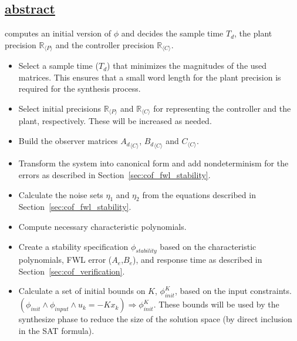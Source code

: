 \documentclass[a4paper,UKenglish]{lipics-v2018}
\newcommand{\mat}[1]{{#1}}
\renewcommand{\vec}[1]{{#1}}
\newcommand{\note}[1]{\textcolor{red}{[#1]}}
\begin{document}
\subsection*{\underline{{\sc abstract}}} computes an initial version of $\phi$
and decides the sample time $T_d$,
the plant precision $\mathbb{R}_{\langle P \rangle}$ and the controller precision
$\mathbb{R}_{\langle C \rangle}$.
%
\begin{itemize}
\item Select a sample time ($T_d$) that minimizes the magnitudes of the used matrices.
This ensures that a small word length for the plant precision is required for
the synthesis process.
\item Select initial precisions $\mathbb{R}_{\langle P \rangle}$ and $\mathbb{R}_{\langle C \rangle}$
  for representing the controller and the plant, respectively. These will be increased as needed.
\item Build the observer matrices ${\mat{A}_d}_{\langle C \rangle}$, ${\mat{B}_d}_{\langle C \rangle}$
and $\mat{C}_{\langle C \rangle}$. %
\item Transform the system into canonical form and add nondeterminism for the errors
as described in Section~\ref{sec:cof_fwl_stability}. 
\item Calculate the noise sets $\eta_1$ and $\eta_2$ from the equations
described in Section~\ref{sec:cof_fwl_stability}.
\item Compute necessary characteristic polynomials. 
\item Create a stability specification $\phi_{stability}$ based on the characteristic polynomials, FWL
error ($\mat{A}_e$,$\mat{B}_e$), and response time %
as described in Section~\ref{sec:cof_verification}.%
\item Calculate a set of initial bounds on $\mat{K}$, 
$\phi_\mathit{init}^{K}$,
based on the input constraints.
$(\phi_\mathit{init} \wedge \phi_\mathit{input} \wedge u_k=-\mat{K} \vec{x}_k)
\Rightarrow \phi_\mathit{init}^{K}$.
These bounds will be used by the {\sc synthesize} phase to reduce the size of the solution space (by direct inclusion in the SAT formula).
\end{itemize}
\end{document}
